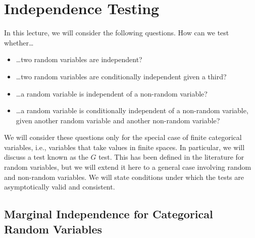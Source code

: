 \section{Independence Testing}

In this lecture, we will consider the following questions. How can we test whether\dots
\begin{itemize}
  \item \dots two random variables are independent?
  \item \dots two random variables are conditionally independent given a third?
  \item \dots a random variable is independent of a non-random variable?
  \item \dots a random variable is conditionally independent of a non-random variable, given another random variable and another non-random variable?
\end{itemize}
We will consider these questions only for the special case of finite categorical variables, i.e., 
variables that take values in finite spaces.  In particular, we will discuss a test known as the $G$ test.
This has been defined in the literature for random variables, but we will extend it here to a general case
involving random and non-random variables.
We will state conditions under which the tests are asymptotically valid and consistent.

\subsection{Marginal Independence for Categorical Random Variables}

